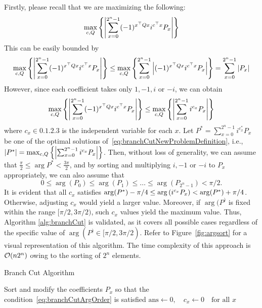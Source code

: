 \documentclass[a4paper, onecolumn, 11pt, longbibliography]{quantumarticle}
\begin{document}
Firstly, please recall that we are maximizing the following:
\begin{equation*}
  \max_{c,Q} \qty{ \abs{\sum_{x=0}^{2^n-1} (-1)^{x^\top Q x} i^{c^\top x} P_x} }
\end{equation*}
This can be easily bounded by
\begin{equation*}
  \max_{c,Q} \qty{ \abs{\sum_{x=0}^{2^n-1} (-1)^{x^\top Q x} i^{c^\top x} P_x} }
  \leq \max_{c,Q} \qty{ \sum_{x=0}^{2^n-1} \abs{(-1)^{x^\top Q x} i^{c^\top x} P_x} }
  = \sum_{x=0}^{2^n-1} \abs{P_x}
\end{equation*}
However, since each coefficient takes only $1, -1, i$ or $-i$,
we can obtain
\begin{equation}\label{eq:branchCutNewProblemDefinition}
  \max_{c,Q} \qty{ \abs{\sum_{x=0}^{2^n-1} (-1)^{x^\top Q x} i^{c^\top x} P_x} }
  \leq \max_{c,Q} \qty{ \abs{\sum_{x=0}^{2^n-1} i^{c_x} P_x} }
\end{equation}
where $c_x \in \qty{0, 1, 2, 3}$ is the independent variable for each $x$.
Let $P^* = \sum_{x=0}^{2^n-1} i^{c_x^*} P_x$ be
one of the optimal solutions of~\eqref{eq:branchCutNewProblemDefinition},
i.e., $\abs{P^*} = \max_{c,Q} \qty{ \abs{\sum_{x=0}^{2^n-1} i^{c_x} P_x} }$.
Then, without loss of generality,
we can assume that $\frac{\pi}{2} \leq \arg P^* < \frac{3\pi}{2}$,
and by sorting and multiplying $i,-1$ or $-i$ to $P_x$ appropriately,
we can also assume that
\begin{equation}\label{eq:branchCutArgOrder}
  0 \leq \arg(P_0) \leq \arg(P_1) \leq \dots \leq \arg(P_{2^n-1}) < \pi/2.
\end{equation}
It is evident that all $c_x$ satisfies
$\arg(P^*) - \pi/4 \leq \arg\qty(i^{c_x} P_x) < \arg(P^*) + \pi/4$.
Otherwise, adjusting $c_x$ would yield a larger value.
Moreover, if $\arg(P^)$ is fixed within the range
$[\pi/2, 3\pi/2)$, such $c_x$ values yield the maximum value.
Thus, Algorithm \ref{alg:branchCut} is validated,
as it covers all possible cases regardless of the specific value
of $\arg(P^) \in [\pi/2, 3\pi/2)$.
Refer to Figure~\ref{fig:argsort} for a visual representation of this algorithm.
The time complexity of this approach is
$\order{n2^n}$ owing to the sorting of $2^n$ elements.

\begin{algorithm}
  \caption{Branch Cut Algorithm}
  \label{alg:branchCut}
  Sort and modify the coefficients $P_x$ so that the condition~\eqref{eq:branchCutArgOrder} is satisfied\;
  $\mathrm{ans} \leftarrow 0, \quad c_x \leftarrow 0 \quad \text{for all } x$\;
\end{algorithm}
\end{document}
